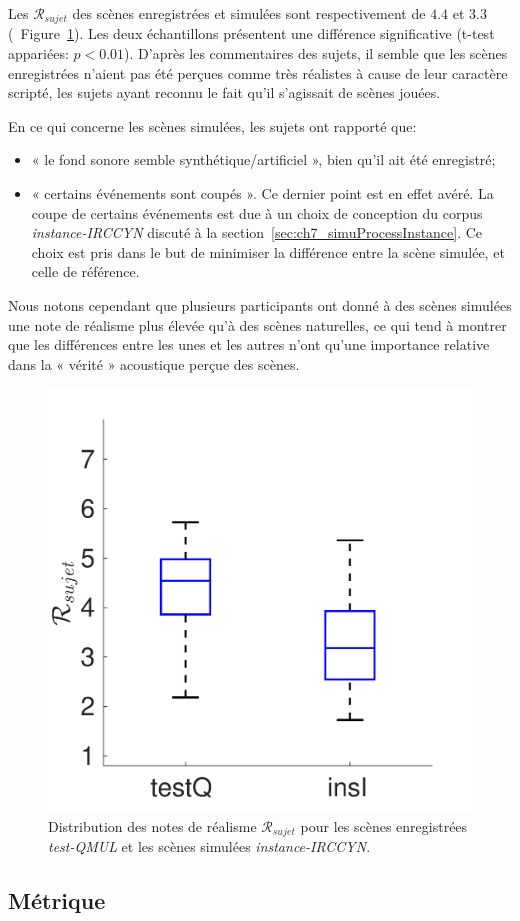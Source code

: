 Les $\mathcal{R}_{sujet}$ des scènes enregistrées et simulées sont respectivement de $4.4$ et $3.3$ (\cf~Figure~\ref{fig:xpRealism}). Les deux échantillons présentent une différence significative (t-test appariées: $p<0.01$). D'après les commentaires des sujets, il semble que les scènes enregistrées n'aient pas été perçues comme très réalistes à cause de leur caractère scripté, les sujets ayant reconnu le fait qu'il s'agissait de scènes jouées. 

En ce qui concerne les scènes simulées, les sujets ont rapporté que: 

\begin{itemize}
\item « le fond sonore semble synthétique/artificiel », bien qu'il ait été enregistré;
\item « certains événements sont coupés ». Ce dernier point est en effet avéré. La coupe de certains événements est due à un choix de conception du corpus \emph{instance-IRCCYN} discuté à la section~\ref{sec:ch7_simuProcessInstance}. Ce choix est pris dans le but de minimiser la différence entre la scène simulée, et celle de référence. 
\end{itemize}

Nous notons cependant que plusieurs participants ont donné à des scènes simulées une note de réalisme plus élevée qu'à des scènes naturelles, ce qui tend à montrer que les différences entre les unes et les autres n'ont qu'une importance relative dans la « vérité » acoustique perçue des scènes.

\begin{figure}[t]
\begin{center}
\includegraphics[width=.33\textwidth]{gfx/ch_7/xp_realism_2}
\caption{Distribution des notes de réalisme $\mathcal{R}_{sujet}$ pour les scènes enregistrées \emph{test-QMUL} et les scènes simulées \emph{instance-IRCCYN}.}
\label{fig:xpRealism} 
\end{center}
\end{figure}

\subsection{Métrique}
\label{sec:ch7_dcase2013metrique}

